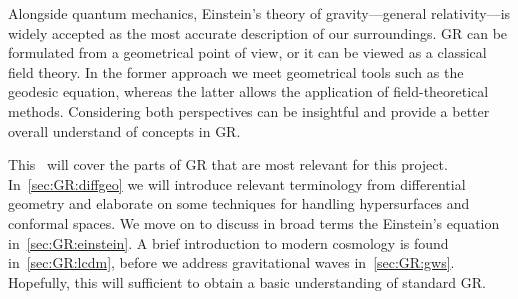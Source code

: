 













Alongside quantum mechanics, Einstein's theory of gravity---general relativity---is widely accepted as the most accurate description of our surroundings. GR can be formulated from a geometrical point of view, or it can be viewed as a classical field theory. In the former approach we meet geometrical tools such as the geodesic equation, whereas the latter allows the application of field-theoretical methods. 
Considering both perspectives can be insightful and provide a better overall understand of concepts in GR.



This~ will cover the parts of GR that are most relevant for this project. In~\cref{sec:GR:diffgeo} we will introduce relevant terminology from differential geometry and elaborate on some techniques for handling hypersurfaces and conformal spaces. We move on to discuss in broad terms the Einstein's equation in~\cref{sec:GR:einstein}. A brief introduction to modern cosmology is found in~\cref{sec:GR:lcdm}, before we address gravitational waves in~\cref{sec:GR:gws}. Hopefully, this will sufficient to obtain a basic understanding of standard GR.





